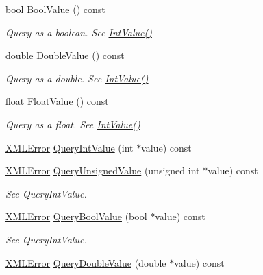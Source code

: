 \begin{DoxyCompactItemize}
bool \hyperlink{classtinyxml2_1_1_x_m_l_attribute_afb444b7a12527f836aa161b54b2f7ce7}{Bool\-Value} () const 
\begin{DoxyCompactList}\small\item\em Query as a boolean. See \hyperlink{classtinyxml2_1_1_x_m_l_attribute_a949d02a5888092cc68c1e29185301863}{Int\-Value()} \end{DoxyCompactList}\item 
double \hyperlink{classtinyxml2_1_1_x_m_l_attribute_a336153e5aa1b7ccd6502fc249bfb3fd7}{Double\-Value} () const 
\begin{DoxyCompactList}\small\item\em Query as a double. See \hyperlink{classtinyxml2_1_1_x_m_l_attribute_a949d02a5888092cc68c1e29185301863}{Int\-Value()} \end{DoxyCompactList}\item 
float \hyperlink{classtinyxml2_1_1_x_m_l_attribute_ae3d51ff98eacc1dc46efcfdaee5c84ad}{Float\-Value} () const 
\begin{DoxyCompactList}\small\item\em Query as a float. See \hyperlink{classtinyxml2_1_1_x_m_l_attribute_a949d02a5888092cc68c1e29185301863}{Int\-Value()} \end{DoxyCompactList}\item 
\hyperlink{namespacetinyxml2_a1fbf88509c3ac88c09117b1947414e08}{X\-M\-L\-Error} \hyperlink{classtinyxml2_1_1_x_m_l_attribute_ad510a83c4ff2755844bb250b125d28ff}{Query\-Int\-Value} (int $\ast$value) const 
\item 
\hyperlink{namespacetinyxml2_a1fbf88509c3ac88c09117b1947414e08}{X\-M\-L\-Error} \hyperlink{classtinyxml2_1_1_x_m_l_attribute_ac93f5981adfd62ac4ea76bfa668ee2b4}{Query\-Unsigned\-Value} (unsigned int $\ast$value) const 
\begin{DoxyCompactList}\small\item\em See Query\-Int\-Value. \end{DoxyCompactList}\item 
\hyperlink{namespacetinyxml2_a1fbf88509c3ac88c09117b1947414e08}{X\-M\-L\-Error} \hyperlink{classtinyxml2_1_1_x_m_l_attribute_a9e9b94369f182df72aaac9acd04afead}{Query\-Bool\-Value} (bool $\ast$value) const 
\begin{DoxyCompactList}\small\item\em See Query\-Int\-Value. \end{DoxyCompactList}\item 
\hyperlink{namespacetinyxml2_a1fbf88509c3ac88c09117b1947414e08}{X\-M\-L\-Error} \hyperlink{classtinyxml2_1_1_x_m_l_attribute_a0872c05edea2a7cde4bd96c1e9cb2fc4}{Query\-Double\-Value} (double $\ast$value) const 

\end{DoxyCompactItemize}

